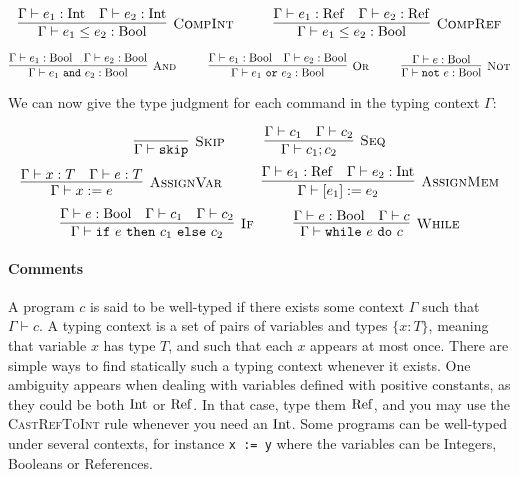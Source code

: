 \[
\Rule{CompInt}{\Gamma \vdash e_1 \leq e_2: \Bool}{\Gamma \vdash e_1: \Int \quad \Gamma \vdash e_2: \Int}
\hspace*{1cm}
\Rule{CompRef}{\Gamma \vdash e_1 \leq e_2: \Bool}{\Gamma \vdash e_1: \Ref \quad \Gamma \vdash e_2: \Ref}
\]

\[
\Rule{And}{\Gamma \vdash e_1~\texttt{and}~e_2: \Bool}{\Gamma \vdash e_1: \Bool \quad \Gamma \vdash e_2: \Bool}
\hspace*{1cm}
\Rule{Or}{\Gamma \vdash e_1~\texttt{or}~e_2: \Bool}{\Gamma \vdash e_1: \Bool \quad \Gamma \vdash e_2: \Bool}
\hspace*{1cm}
\Rule{Not}{\Gamma \vdash \texttt{not}~e: \Bool}{\Gamma \vdash e: \Bool}
\]

We can now give the type judgment for each command in the typing context $\Gamma$:

\[
	\Rule{Skip}{\Gamma \vdash \texttt{skip}}{} \hspace*{1cm}
	\Rule{Seq}{\Gamma \vdash c_1 ; c_2}{\Gamma \vdash c_1 \quad \Gamma \vdash c_2}
\]
\[
	\Rule{AssignVar}{\Gamma \vdash x := e}{\Gamma \vdash x: T \quad \Gamma \vdash e: T} \hspace*{1cm}
	\Rule{AssignMem}{\Gamma \vdash [e_1] := e_2}{\Gamma \vdash e_1: \Ref \quad \Gamma \vdash e_2: \Int}
\]
\[
	\Rule{If}{\Gamma \vdash \texttt{if}~e~\texttt{then}~c_1~\texttt{else}~c_2}{\Gamma \vdash e: \Bool \quad \Gamma \vdash c_1 \quad \Gamma \vdash c_2}
\hspace*{1cm}
	\Rule{While}{\Gamma \vdash \texttt{while}~e~\texttt{do}~c}{\Gamma \vdash e: \Bool \quad \Gamma \vdash c} 
\]


\paragraph{Comments}

A program $c$ is said to be well-typed if there exists some context $\Gamma$ such that $\Gamma\vdash c$.
A typing context is a set of pairs of variables and types $\{x:T\}$, meaning that variable $x$ has type $T$, and such that each $x$ appears at most once.
There are simple ways to find statically such a typing context whenever it exists. One ambiguity appears when dealing with variables defined with positive constants, as they could be both $\mathrm{Int}$ or $\mathrm{Ref}$. In that case, type them $\mathrm{Ref}$, and you may use the \textsc{CastRefToInt} rule whenever you need an $\mathrm{Int}$.
Some programs can be well-typed under several contexts, for instance \texttt{x := y} where the variables can be Integers, Booleans or References.

